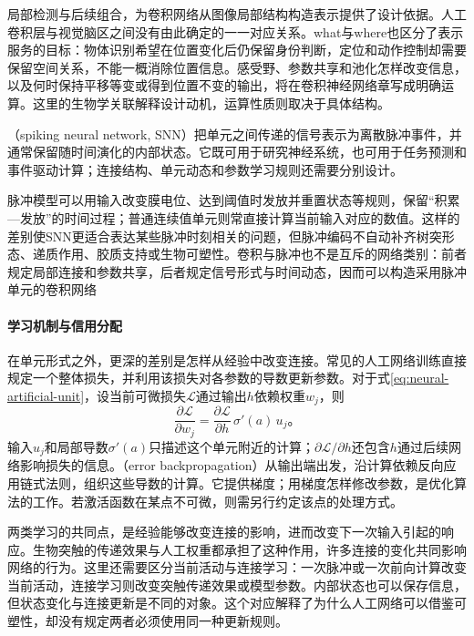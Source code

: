 局部检测与后续组合，为卷积网络从图像局部结构构造表示提供了设计依据。人工卷积层与视觉脑区之间没有由此确定的一一对应关系。what与where也区分了表示服务的目标：物体识别希望在位置变化后仍保留身份判断，定位和动作控制却需要保留空间关系，不能一概消除位置信息。感受野、参数共享和池化怎样改变信息，以及何时保持平移等变或得到位置不变的输出，将在卷积神经网络章写成明确运算。这里的生物学关联解释设计动机，运算性质则取决于具体结构。

（spiking neural network, SNN）把单元之间传递的信号表示为离散脉冲事件，并通常保留随时间演化的内部状态。它既可用于研究神经系统，也可用于任务预测和事件驱动计算；连接结构、单元动态和参数学习规则还需要分别设计。

脉冲模型可以用输入改变膜电位、达到阈值时发放并重置状态等规则，保留“积累—发放”的时间过程；普通连续值单元则常直接计算当前输入对应的数值。这样的差别使SNN更适合表达某些脉冲时刻相关的问题，但脉冲编码不自动补齐树突形态、递质作用、胶质支持或生物可塑性。卷积与脉冲也不是互斥的网络类别：前者规定局部连接和参数共享，后者规定信号形式与时间动态，因而可以构造采用脉冲单元的卷积网络

\paragraph{学习机制与信用分配}
在单元形式之外，更深的差别是怎样从经验中改变连接。常见的人工网络训练直接规定一个整体损失，并利用该损失对各参数的导数更新参数。对于式\eqref{eq:neural-artificial-unit}，设当前可微损失$\mathcal{L}$通过输出$h$依赖权重$w_j$，则
\begin{equation}
  \frac{\partial\mathcal{L}}{\partial w_j}
  =\frac{\partial\mathcal{L}}{\partial h}\,\sigma'(a)\,u_j\text{。}
  \label{eq:neural-unit-credit}
\end{equation}
输入$u_j$和局部导数$\sigma'(a)$只描述这个单元附近的计算；$\partial\mathcal{L}/\partial h$还包含$h$通过后续网络影响损失的信息。（error backpropagation）从输出端出发，沿计算依赖反向应用链式法则，组织这些导数的计算。它提供梯度；用梯度怎样修改参数，是优化算法的工作。若激活函数在某点不可微，则需另行约定该点的处理方式。

两类学习的共同点，是经验能够改变连接的影响，进而改变下一次输入引起的响应。生物突触的传递效果与人工权重都承担了这种作用，许多连接的变化共同影响网络的行为。这里还需要区分当前活动与连接学习：一次脉冲或一次前向计算改变当前活动，连接学习则改变突触传递效果或模型参数。内部状态也可以保存信息，但状态变化与连接更新是不同的对象。这个对应解释了为什么人工网络可以借鉴可塑性，却没有规定两者必须使用同一种更新规则。

